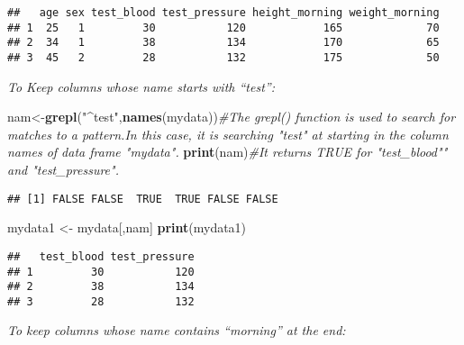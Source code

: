 \documentclass[]{book}
\newenvironment{Shaded}{\begin{snugshade}}{\end{snugshade}}
\newcommand{\KeywordTok}[1]{\textcolor[rgb]{0.13,0.29,0.53}{\textbf{#1}}}
\newcommand{\StringTok}[1]{\textcolor[rgb]{0.31,0.60,0.02}{#1}}
\newcommand{\CommentTok}[1]{\textcolor[rgb]{0.56,0.35,0.01}{\textit{#1}}}
\newcommand{\NormalTok}[1]{#1}
\theoremstyle{definition}
\theoremstyle{definition}
\theoremstyle{definition}
\theoremstyle{remark}
\begin{document}
\begin{verbatim}
##   age sex test_blood test_pressure height_morning weight_morning
## 1  25   1         30           120            165             70
## 2  34   1         38           134            170             65
## 3  45   2         28           132            175             50
\end{verbatim}

\emph{To Keep columns whose name starts with ``test'':}

\begin{Shaded}
\begin{Highlighting}[]
\NormalTok{nam<-}\KeywordTok{grepl}\NormalTok{(}\StringTok{"^test"}\NormalTok{,}\KeywordTok{names}\NormalTok{(mydata))}\CommentTok{#The grepl() function is used to search for matches to a pattern.In this case, it is searching "test" at starting in the column names of data frame "mydata". }
\KeywordTok{print}\NormalTok{(nam)}\CommentTok{#It returns TRUE for "test_blood"" and "test_pressure".}
\end{Highlighting}
\end{Shaded}

\begin{verbatim}
## [1] FALSE FALSE  TRUE  TRUE FALSE FALSE
\end{verbatim}

\begin{Shaded}
\begin{Highlighting}[]
\NormalTok{mydata1 <-}\StringTok{ }\NormalTok{mydata[,nam]}
\KeywordTok{print}\NormalTok{(mydata1)}
\end{Highlighting}
\end{Shaded}

\begin{verbatim}
##   test_blood test_pressure
## 1         30           120
## 2         38           134
## 3         28           132
\end{verbatim}

\emph{To keep columns whose name contains ``morning'' at the end:}

\begin{Shaded}
\end{Shaded}
\end{document}
